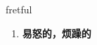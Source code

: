 
\begin{frame}
{\huge fretful}
\begin{center}
\begin{enumerate}\Large
  \item \textbf{易怒的，烦躁的}
\end{enumerate}
\end{center}
\end{frame}

